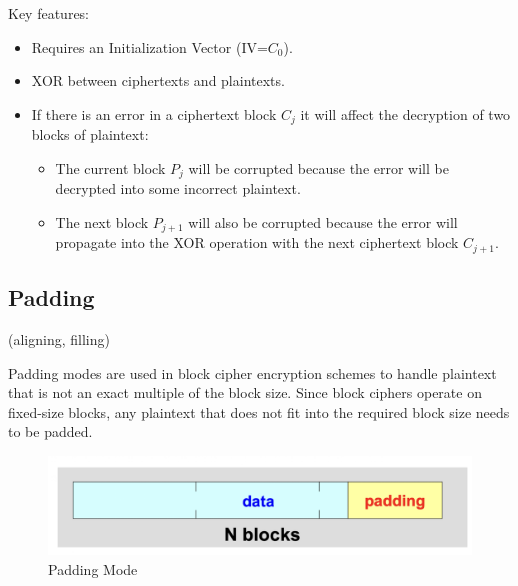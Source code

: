 Key features:
\begin{itemize}
    \item Requires an Initialization Vector (IV=$C_0$).
    \item XOR between ciphertexts and plaintexts.
    \item If there is an error in a ciphertext block $C_j$ it will affect the decryption of two blocks of plaintext:
    \begin{itemize}
        \item The current block $P_j$ will be corrupted because the error will be decrypted into some incorrect plaintext. 
        \item The next block  $P_{j+1}$  will also be corrupted because the error will propagate into the XOR operation with the next ciphertext block  $C_{j+1}$.
    \end{itemize} 
\end{itemize}

\subsection{Padding}
\begin{center}
    (aligning, filling)
\end{center}

Padding modes are used in block cipher encryption schemes to handle plaintext that is not an exact multiple of the block size. Since block ciphers operate on fixed-size blocks, any plaintext that does not fit into the required block size needs to be padded.
\begin{figure}[H]
    \includegraphics[width=\linewidth]{Images/Cryptography/padding.png}
    \caption{Padding Mode}
    
\end{figure}

